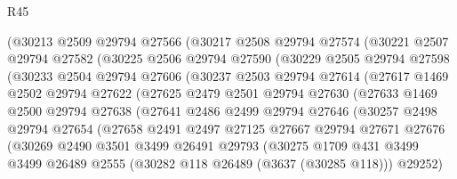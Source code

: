 \begin{lexlean}{R45}
\begin{coremodule}
          (@30213
            @2509
            @29794
            @27566
            (@30217
              @2508
              @29794
              @27574
              (@30221
                @2507
                @29794
                @27582
                (@30225
                  @2506
                  @29794
                  @27590
                  (@30229
                    @2505
                    @29794
                    @27598
                    (@30233
                      @2504
                      @29794
                      @27606
                      (@30237
                        @2503
                        @29794
                        @27614
                        (@27617
                          @1469
                          @2502
                          @29794
                          @27622
                          (@27625
                            @2479
                            @2501
                            @29794
                            @27630
                            (@27633
                              @1469
                              @2500
                              @29794
                              @27638
                              (@27641
                                @2486
                                @2499
                                @29794
                                @27646
                                (@30257
                                  @2498
                                  @29794
                                  @27654
                                  (@27658
                                    @2491
                                    @2497
                                    @27125
                                    @27667
                                    @29794
                                    @27671
                                    @27676
                                    (@30269
                                      @2490
                                      @3501
                                      @3499
                                      @26491
                                      @29793
                                      (@30275
                                        @1709
                                        @431
                                        @3499
                                        @3499
                                        @26489
                                        @2555
                                        (@30282 @118 @26489 (@3637 (@30285 @118)))
                                        @29252)

\end{coremodule}
\end{lexlean}
